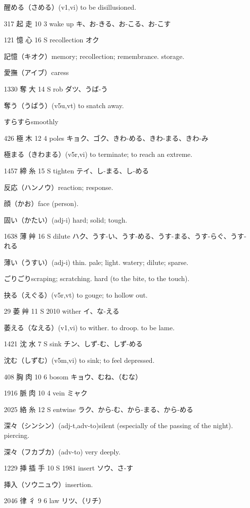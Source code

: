 醒める（さめる）(v1,vi) to be disillusioned.

317	起		走	10	3		wake up	キ、お-きる、お-こる、お-こす

121	憶		心	16	S		recollection	オク

記憶（キオク）memory; recollection; remembrance. storage.

愛撫（アイブ）caress

1330	奪		大	14	S		rob	ダツ、うば-う

奪う（うばう）(v5u,vt) to snatch away.

すらすらsmoothly

426	極		木	12	4		poles	キョク、ゴク、きわ-める、きわ-まる、きわ-み

極まる（きわまる）(v5r,vi) to terminate; to reach an extreme.

1457	締		糸	15	S		tighten	テイ、し-まる、し-める

反応（ハンノウ）reaction; response.

顔（かお）face (person).

固い（かたい）(adj-i) hard; solid; tough.

1638	薄		艸	16	S		dilute	ハク、うす-い、うす-める、うす-まる、うす-らぐ、うす-れる

薄い（うすい）(adj-i) thin. pale; light. watery; dilute; sparse.

ごりごりscraping; scratching. hard (to the bite, to the touch).

抉る（えぐる）(v5r,vt) to gouge; to hollow out.

29	萎		艸	11	S	2010	wither	イ、な-える

萎える（なえる）(v1,vi) to wither. to droop. to be lame.

1421	沈		水	7	S		sink	チン、しず-む、しず-める

沈む（しずむ）(v5m,vi) to sink; to feel depressed.

408	胸		肉	10	6		bosom	キョウ、むね、（むな）

1916	脈		肉	10	4		vein	ミャク

2025	絡		糸	12	S		entwine	ラク、から-む、から-まる、から-める

深々（シンシン）(adj-t,adv-to)silent (especially of the passing of the night). piercing.

深々（フカブカ）(adv-to) very deeply.

1229	挿	插	手	10	S	1981	insert	ソウ、さ-す

挿入（ソウニュウ）insertion.

2046	律		彳	9	6		law	リツ、（リチ）

